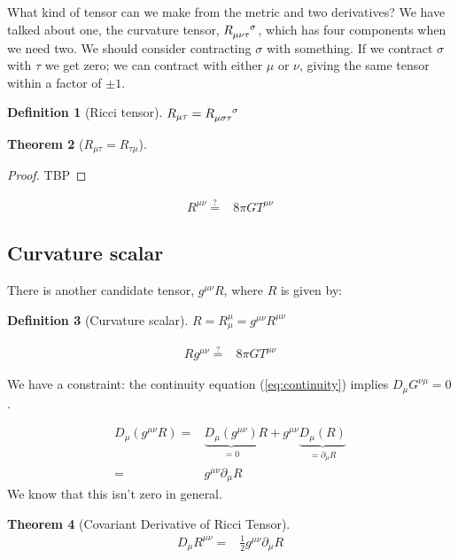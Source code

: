\documentclass[]{article}
\newtheorem{thm}{Theorem}
\newtheorem{defn}[thm]{Definition}
\begin{document}
{What kind of tensor can we make from the metric and two derivatives? We have talked about one, the curvature tensor, $R\indices{_{\mu\nu\tau}^\sigma}$, which has four components when we need two. We should consider contracting $\sigma$ with something. If we contract $\sigma$ with $\tau$ we get zero; we can contract with either $\mu$ or $\nu$, giving the same tensor within a factor of $\pm 1$.

\begin{defn}[Ricci tensor]
	 $R_{\mu\tau}=R\indices{_{\mu\sigma\tau}^\sigma}$
\end{defn}
\begin{thm}[$R_{\mu\tau}=R_{\tau\mu}$]
	
\end{thm}
\begin{proof}
	TBP
\end{proof}

\begin{align*}
	R^{\mu\nu}\overset{?}{=}& 8 \pi G T^{\mu\nu}
\end{align*}

\subsection{Curvature scalar}

There is another candidate tensor, $g^{\mu\nu}R$, where $R$ is given by:

\begin{defn}[Curvature scalar]
	$R = R_\mu^\mu = g^{\mu\nu}R^{\mu\nu}$
\end{defn}

\begin{align*}
	Rg^{\mu\nu}\overset{?}{=}& 8 \pi G T^{\mu\nu}
\end{align*}

We have a constraint: the continuity equation (\ref{eq:continuity}) implies $D_\mu G^{\nu\mu}=0$.

\begin{align*}
	D_\mu(g^{\mu\nu}R) =& \underbrace{D_\mu(g^{\mu\nu})}_\text{$=0$}R + g^{\mu\nu}\underbrace{D_\mu(R)}_\text{$=\partial_\mu R$}\\
	=& g^{\mu\nu}\partial_\mu R
\end{align*}
We know that this isn't zero in general.

\begin{thm}[Covariant Derivative of Ricci Tensor]
	\begin{align*}
		D_\mu R^{\mu\nu} =& \frac{1}{2} g^{\mu\nu}\partial_\mu R
	\end{align*}
\end{thm}

}
\end{document}
